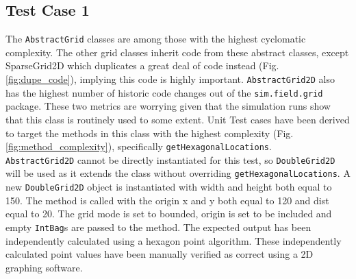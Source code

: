\documentclass[11pt]{article}
\begin{document}
\subsection{Test Case 1}


The \texttt{AbstractGrid} classes are among those with the highest cyclomatic complexity.
The other grid classes inherit code from these abstract classes, except SparseGrid2D which duplicates a great deal of code instead (Fig. \ref{fig:dupe_code}), implying this code is highly important.
\texttt{AbstractGrid2D} also has the highest number of historic code changes out of the \texttt{sim.field.grid} package.
These two metrics are worrying given that the simulation runs show that this class is routinely used to some extent.
Unit Test cases have been derived to target the methods in this class with the highest complexity (Fig. \ref{fig:method_complexity}), specifically \texttt{getHexagonalLocations}.
\\

\texttt{AbstractGrid2D} cannot be directly instantiated for this test, so \texttt{DoubleGrid2D} will be used as it extends the class without overriding \texttt{getHexagonalLocations}.
A new \texttt{DoubleGrid2D} object is instantiated with width and height both equal to 150.
The method is called with the origin x and y both equal to 120 and dist equal to 20.
The grid mode is set to bounded, origin is set to be included and empty \texttt{IntBag}s are passed to the method.
The expected output has been independently calculated using a hexagon point algorithm.
These independently calculated point values have been manually verified as correct using a 2D graphing software.
\end{document}
